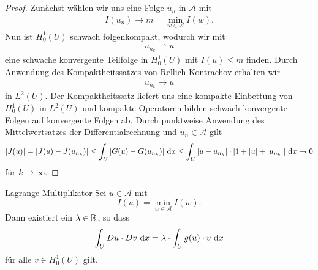 \begin{proof}
Zunächst wählen wir uns eine Folge $u_n$ in $\mathcal{A}$ mit
\begin{align*}
I(u_n) \rightarrow m = \min \limits_{w \in \mathcal{A}} I(w).
\end{align*}
Nun ist $H_0^1(U)$ schwach folgenkompakt, wodurch wir mit
\begin{align*}
u_{n_k} \rightharpoonup u
\end{align*}
eine schwache konvergente Teilfolge in $H_0^1(U)$ mit $I(u) \leq m$ finden.
Durch Anwendung des Kompaktheitssatzes von Rellich-Kontrachov erhalten wir 
\begin{align*}
u_{n_k} \rightarrow u
\end{align*}
in $L^2(U)$.
Der Kompaktheitssatz liefert uns eine kompakte Einbettung von $H_0^1(U)$ in $L^2(U)$
und kompakte Operatoren bilden schwach konvergente Folgen auf konvergente Folgen ab.
Durch punktweise Anwendung des Mittelwertsatzes der Differentialrechnung und $u_n \in \mathcal{A}$ gilt
\begin{align*}
|J(u)| 
= |J(u) - J(u_{n_k})|
\leq \int_U | G(u) - G(u_{n_k})| \ \text{\rmfamily d} x
\leq \int_U | u - u_{n_k}| \cdot | 1 + |u| + |u_{n_k}|| \ \text{\rmfamily d} x
\rightarrow 0
\end{align*}
für $k \rightarrow \infty$.
\end{proof}

\begin{genericthm}{Lagrange Multiplikator}\label{skript:1.3}
Sei $u \in \mathcal{A}$ mit
\begin{equation}\label{equ:1.3}
I ( u) = \min \limits_{w \in \mathcal{A}} I(w).
\end{equation}
Dann existiert ein $\lambda \in \mathbb{R}$, so dass
\begin{equation}\label{equ:1.4}
\int_U Du \cdot Dv \ \text{\rmfamily d} x
= \lambda \cdot \int_U g(u) \cdot v \ \text{\rmfamily d} x 
\end{equation}
für alle $v \in H_0^1(U)$ gilt.
\end{genericthm}

